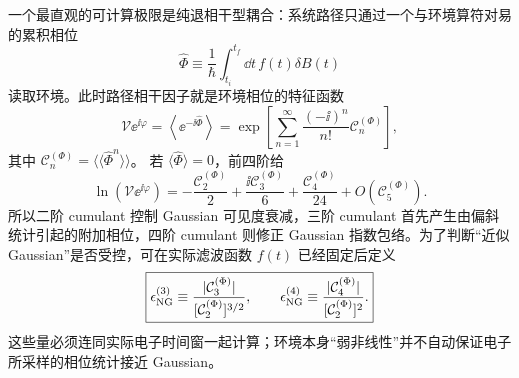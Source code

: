 一个最直观的可计算极限是纯退相干型耦合：系统路径只通过一个与环境算符对易的累积相位
\begin{equation*}
\hat\Phi
\equiv\frac1\hbar\int_{t_i}^{t_f}\dd t\,f(t)\delta B(t)
\end{equation*}
读取环境。此时路径相干因子就是环境相位的特征函数
\begin{equation}
\boxed{
\mathcal V\ee^{\ii\varphi}
=\left\langle\ee^{-\ii\hat\Phi}\right\rangle
=\exp\!\left[
\sum_{n=1}^{\infty}
\frac{(-\ii)^n}{n!}\mathcal C_n^{(\Phi)}
\right],}
\label{eq:non_gaussian_phase_characteristic_cumulants}
\end{equation}
其中
$\mathcal C_n^{(\Phi)}=\langle\!\langle\hat\Phi^n\rangle\!\rangle$。
若 $\langle\hat\Phi\rangle=0$，前四阶给
\begin{equation*}
\ln(\mathcal V\ee^{\ii\varphi})
=-\frac{\mathcal C_2^{(\Phi)}}{2}
+\frac{\ii\mathcal C_3^{(\Phi)}}{6}
+\frac{\mathcal C_4^{(\Phi)}}{24}+O(\mathcal C_5^{(\Phi)}).
\end{equation*}
所以二阶 cumulant 控制 Gaussian 可见度衰减，三阶 cumulant 首先产生由偏斜统计引起的附加相位，四阶 cumulant 则修正 Gaussian 指数包络。为了判断“近似 Gaussian”是否受控，可在实际滤波函数 $f(t)$ 已经固定后定义
\begin{equation}
\boxed{
\epsilon_{\rm NG}^{(3)}
\equiv
\frac{|\mathcal C_3^{(\Phi)}|}{[\mathcal C_2^{(\Phi)}]^{3/2}},
\qquad
\epsilon_{\rm NG}^{(4)}
\equiv
\frac{|\mathcal C_4^{(\Phi)}|}{[\mathcal C_2^{(\Phi)}]^{2}}.}
\label{eq:non_gaussian_standardized_cumulant_control}
\end{equation}
这些量必须连同实际电子时间窗一起计算；环境本身“弱非线性”并不自动保证电子所采样的相位统计接近 Gaussian。

